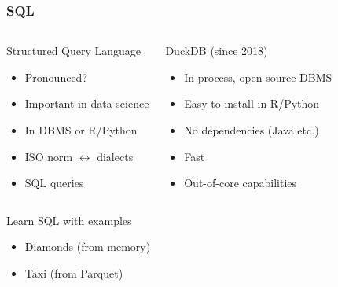 \begin{frame}
	\frametitle{SQL}
	\begin{columns}[onlytextwidth]
		\begin{block}{Structured Query Language}
			\begin{itemize}
				\item Pronounced?
				\item Important in data science
				\item In DBMS or R/Python
				\item ISO norm $\leftrightarrow$ dialects
				\item SQL queries
			\end{itemize}
		\end{block}
		
		\begin{block}{DuckDB (since 2018)}
			\begin{itemize}
				\item In-process, open-source DBMS
				\item Easy to install in R/Python
				\item No dependencies (Java etc.)
				\item Fast
				\item Out-of-core capabilities
			\end{itemize}
		\end{block}
	\end{columns}
	
	\vfill
	
	\begin{exampleblock}{Learn SQL with examples}
		\begin{itemize}
			\item Diamonds (from memory)
			\item Taxi (from Parquet)
		\end{itemize}
	\end{exampleblock}
\end{frame}

